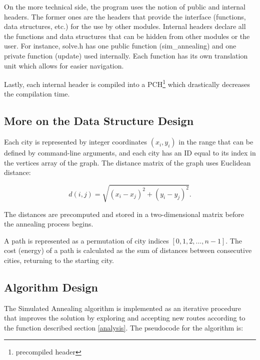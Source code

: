 \documentclass{article}
\begin{document}
On the more technical side, the program uses the notion of public and internal headers. The former ones are the headers that provide the interface (functions, data structures, etc.) for the use by other modules. Internal headers declare all the functions and data structures that can be hidden from other modules or the user. For instance, solve.h has one public function (sim\_annealing) and one private function (update) used internally. Each function has its own translation unit which allows for easier navigation.

Lastly, each internal header is compiled into a PCH\footnote{precompiled header} which drastically decreases the compilation time.

\subsection{More on the Data Structure Design}

Each city is represented by integer coordinates $(x_i, y_i)$ in the range that can be defined by command-line arguments, and each city has an ID equal to its index in the vertices array of the graph. The distance matrix of the graph uses Euclidean distance:

\[
d(i, j) = \sqrt{(x_i - x_j)^2 + (y_i - y_j)^2}.
\]

The distances are precomputed and stored in a two-dimensional matrix before the annealing process begins.  

A path is represented as a permutation of city indices \([0, 1, 2, ..., n-1]\).  
The cost (energy) of a path is calculated as the sum of distances between consecutive cities, returning to the starting city.

\subsection{Algorithm Design}

The Simulated Annealing algorithm is implemented as an iterative procedure that improves the solution by exploring and accepting new routes according to the function described section \ref{analysis}. The pseudocode for the algorithm is:
\end{document}
